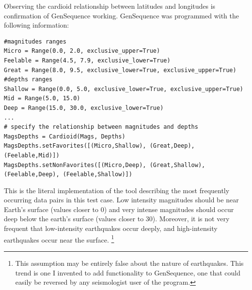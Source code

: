 \noindent{}

\vspace{1cm}
Observing the cardioid relationship between latitudes and longitudes is confirmation of GenSequence working. GenSequence was programmed with the following information:
\vspace{1cm}

\begin{lstlisting}
#magnitudes ranges
Micro = Range(0.0, 2.0, exclusive_upper=True)
Feelable = Range(4.5, 7.9, exclusive_lower=True)
Great = Range(8.0, 9.5, exclusive_lower=True, exclusive_upper=True)
#depths ranges
Shallow = Range(0.0, 5.0, exclusive_lower=True, exclusive_upper=True)
Mid = Range(5.0, 15.0)
Deep = Range(15.0, 30.0, exclusive_lower=True)
...
# specify the relationship between magnitudes and depths
MagsDepths = Cardioid(Mags, Depths)
MagsDepths.setFavorites([(Micro,Shallow), (Great,Deep), (Feelable,Mid)])
MagsDepths.setNonFavorites([(Micro,Deep), (Great,Shallow), (Feelable,Deep), (Feelable,Shallow)])
\end{lstlisting}

\vspace{1cm}
This is the literal implementation of the tool describing the most frequently occurring data pairs in this test case. Low intensity magnitudes should be near Earth's surface (values closer to 0) and very intense magnitudes should occur deep below the earth's surface (values closer to 30). Moreover, it is not very frequent that low-intensity earthquakes occur deeply, and high-intensity earthquakes occur near the surface. \footnote{This assumption may be entirely false about the nature of earthquakes. This trend is one I invented to add functionality to GenSequence, one that could easily be reversed by any seismologist user of the program.}

